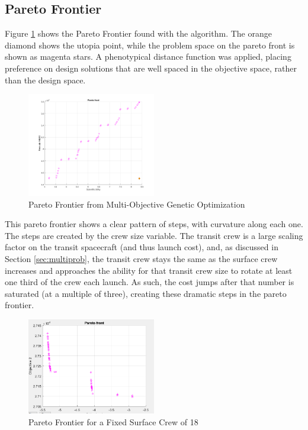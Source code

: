 \documentclass[]{aiaa-pretty}
\begin{document}
\subsection{Pareto Frontier}
Figure \ref{fig:gamultipareto} shows the Pareto Frontier found with the  algorithm.  The orange diamond shows the utopia point, while the problem space on the pareto front is shown as magenta stars. A phenotypical distance function was applied, placing preference on design solutions that are well spaced in the objective space, rather than the design space.
\begin{figure}[h!]
	\centering
	\includegraphics[width=0.5\textwidth]{ga-multi-pareto}
	\caption{Pareto Frontier from Multi-Objective Genetic Optimization}
	\label{fig:gamultipareto}
\end{figure}

This pareto frontier shows a clear pattern of steps, with curvature along each one.  The steps are created by the crew size variable. The transit crew is a large scaling factor on the transit spacecraft (and thus launch cost), and, as discussed in Section \ref{sec:multiprob}, the transit crew stays the same as the surface crew increases and approaches the ability for that transit crew size to rotate at least one third of the crew each launch.  As such, the cost jumps after that number is saturated (at a multiple of three), creating these dramatic steps in the pareto frontier.

\begin{figure}[b!]
	\centering
	\includegraphics[width=0.5\textwidth]{pareto18}
	\caption{Pareto Frontier for a Fixed Surface Crew of 18}
	\label{fig:pareto18}
\end{figure}
\end{document}
